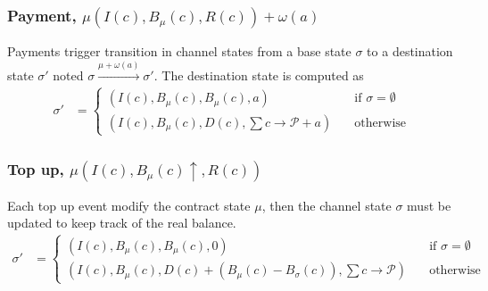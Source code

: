 \documentclass{llncs}
\begin{document}
\subsubsection{Payment, $\mu(I(c), B_\mu(c), R(c))+\omega(a)$} Payments trigger transition in channel states from a base state $\sigma$ to a destination state $\sigma'$ noted $\sigma \xrightarrow{\mu + \omega(a)} \sigma'$.
The destination state is computed as
\begin{equation*}
\begin{split}
  \sigma' &=
  \begin{cases}
      (I(c), B_\mu(c), B_\mu(c), a) & \quad \text{if } \sigma = \emptyset \\
      (I(c), B_\mu(c), D(c), \textstyle \sum c \rightarrow \mathcal{P}+a) & \quad \text{otherwise}
  \end{cases}
\end{split}
\end{equation*}

\subsubsection{Top up, $\mu(I(c), B_\mu(c) \uparrow, R(c))$} Each top up event modify the contract state $\mu$, then the channel state $\sigma$ must be updated to keep track of the real balance.
\begin{equation*}
\begin{split}
  \sigma' &=
  \begin{cases}
      (I(c), B_\mu(c), B_\mu(c), 0) & \quad \text{if } \sigma = \emptyset \\
      (I(c), B_\mu(c), D(c) + (B_\mu(c) - B_\sigma(c)), \textstyle \sum c \rightarrow \mathcal{P}) & \quad \text{otherwise}
  \end{cases}
\end{split}
\end{equation*}
\end{document}
